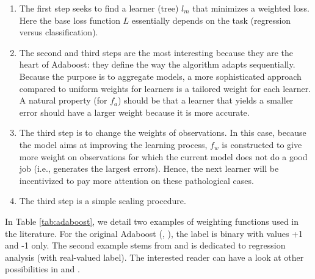 \documentclass[]{krantz}
\providecommand{\tightlist}{%
  \setlength{\itemsep}{0pt}\setlength{\parskip}{0pt}}
\theoremstyle{definition}
\theoremstyle{definition}
\theoremstyle{definition}
\theoremstyle{remark}
\begin{document}
\begin{enumerate}
\def\labelenumi{\arabic{enumi}.}
\tightlist
\item
  The first step seeks to find a learner (tree) \(l_m\) that minimizes a
  weighted loss. Here the base loss function \(L\) essentially depends
  on the task (regression versus classification).
\item
  The second and third steps are the most interesting because they are
  the heart of Adaboost: they define the way the algorithm adapts
  sequentially. Because the purpose is to aggregate models, a more
  sophisticated approach compared to uniform weights for learners is a
  tailored weight for each learner. A natural property (for \(f_a\))
  should be that a learner that yields a smaller error should have a
  larger weight because it is more accurate.
\item
  The third step is to change the weights of observations. In this case,
  because the model aims at improving the learning process, \(f_w\) is
  constructed to give more weight on observations for which the current
  model does not do a good job (i.e., generates the largest errors).
  Hence, the next learner will be incentivized to pay more attention on
  these pathological cases.
\item
  The third step is a simple scaling procedure.
\end{enumerate}

In Table \ref{tab:adaboost}, we detail two examples of weighting
functions used in the literature. For the original Adaboost
(\citet{freund1996experiments}, \citet{freund1997decision}), the label
is binary with values +1 and -1 only. The second example stems from
\citet{drucker1997improving} and is dedicated to regression analysis
(with real-valued label). The interested reader can have a look at other
possibilities in \citet{schapire2003boosting} and
\citet{ridgeway1999boosting}.
\end{document}
